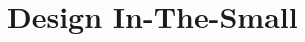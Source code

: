 \documentclass[../DD.tex]{subfiles}
\begin{document}
\chapter{Design In-The-Small}
\thispagestyle{fancy}
	
    
	
\end{document}
